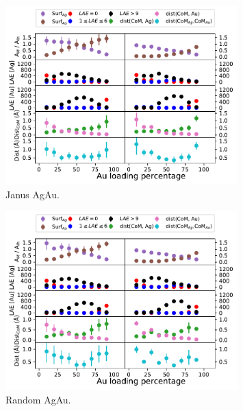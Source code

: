 \begin{figure}
    \centering
    \includegraphics[width=0.8\textwidth]{figures/MD/Alloys/Janus_Ag-Au.pdf}
    \caption{Janus AgAu.}
    \label{fig:AgAuJan_Dyn}
\end{figure}

\begin{figure}
    \centering
    \includegraphics[width=0.8\textwidth]{figures/MD/Alloys/Random_Ag-Au.pdf}
    \caption{Random AgAu.}
    \label{fig:AgAuRnd_Dyn}
\end{figure}


